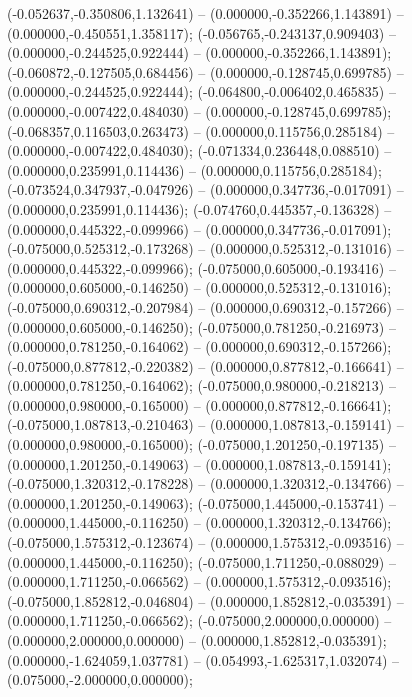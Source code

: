  (-0.052637,-0.350806,1.132641) -- (0.000000,-0.352266,1.143891) -- (0.000000,-0.450551,1.358117);
 (-0.056765,-0.243137,0.909403) -- (0.000000,-0.244525,0.922444) -- (0.000000,-0.352266,1.143891);
 (-0.060872,-0.127505,0.684456) -- (0.000000,-0.128745,0.699785) -- (0.000000,-0.244525,0.922444);
 (-0.064800,-0.006402,0.465835) -- (0.000000,-0.007422,0.484030) -- (0.000000,-0.128745,0.699785);
 (-0.068357,0.116503,0.263473) -- (0.000000,0.115756,0.285184) -- (0.000000,-0.007422,0.484030);
 (-0.071334,0.236448,0.088510) -- (0.000000,0.235991,0.114436) -- (0.000000,0.115756,0.285184);
 (-0.073524,0.347937,-0.047926) -- (0.000000,0.347736,-0.017091) -- (0.000000,0.235991,0.114436);
 (-0.074760,0.445357,-0.136328) -- (0.000000,0.445322,-0.099966) -- (0.000000,0.347736,-0.017091);
 (-0.075000,0.525312,-0.173268) -- (0.000000,0.525312,-0.131016) -- (0.000000,0.445322,-0.099966);
 (-0.075000,0.605000,-0.193416) -- (0.000000,0.605000,-0.146250) -- (0.000000,0.525312,-0.131016);
 (-0.075000,0.690312,-0.207984) -- (0.000000,0.690312,-0.157266) -- (0.000000,0.605000,-0.146250);
 (-0.075000,0.781250,-0.216973) -- (0.000000,0.781250,-0.164062) -- (0.000000,0.690312,-0.157266);
 (-0.075000,0.877812,-0.220382) -- (0.000000,0.877812,-0.166641) -- (0.000000,0.781250,-0.164062);
 (-0.075000,0.980000,-0.218213) -- (0.000000,0.980000,-0.165000) -- (0.000000,0.877812,-0.166641);
 (-0.075000,1.087813,-0.210463) -- (0.000000,1.087813,-0.159141) -- (0.000000,0.980000,-0.165000);
 (-0.075000,1.201250,-0.197135) -- (0.000000,1.201250,-0.149063) -- (0.000000,1.087813,-0.159141);
 (-0.075000,1.320312,-0.178228) -- (0.000000,1.320312,-0.134766) -- (0.000000,1.201250,-0.149063);
 (-0.075000,1.445000,-0.153741) -- (0.000000,1.445000,-0.116250) -- (0.000000,1.320312,-0.134766);
 (-0.075000,1.575312,-0.123674) -- (0.000000,1.575312,-0.093516) -- (0.000000,1.445000,-0.116250);
 (-0.075000,1.711250,-0.088029) -- (0.000000,1.711250,-0.066562) -- (0.000000,1.575312,-0.093516);
 (-0.075000,1.852812,-0.046804) -- (0.000000,1.852812,-0.035391) -- (0.000000,1.711250,-0.066562);
 (-0.075000,2.000000,0.000000) -- (0.000000,2.000000,0.000000) -- (0.000000,1.852812,-0.035391);
 (0.000000,-1.624059,1.037781) -- (0.054993,-1.625317,1.032074) -- (0.075000,-2.000000,0.000000);
